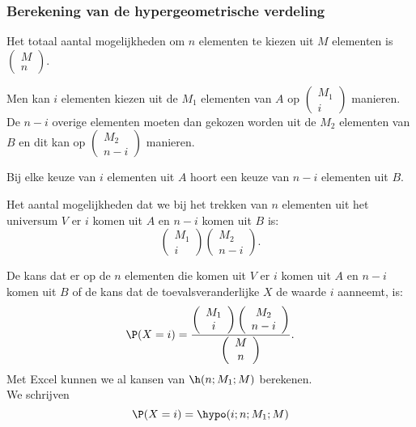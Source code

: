 {\subsubsection{Berekening van de hypergeometrische verdeling}
Het totaal aantal mogelijkheden om $n$ elementen te kiezen uit $M$ elementen is
$\left(\begin{array}{c}
M\\
n
\end{array}
\right)$. 

Men kan $i$ elementen kiezen uit de $M_1$ elementen van $A$ op 
$\left(\begin{array}{c}
M_1\\
i
\end{array}
\right)$ 
manieren. 
De $n-i$ overige elementen moeten dan gekozen worden uit de $M_2$ elementen van
$B$ en dit kan op 
$\left(\begin{array}{c}
M_2\\
n-i
\end{array}
\right)$ 
manieren. 

Bij elke keuze van $i$ elementen uit $A$ hoort een keuze van $n-i$ elementen uit $B$.


Het aantal mogelijkheden dat we bij het trekken van $n$ elementen uit het universum $V$ er $i$ komen uit $A$ en $n-i$ komen uit $B$ is: 
$$\left(\begin{array}{c}
M_1\\
i
\end{array}
\right) 
\left(\begin{array}{c}
M_2\\
n-i
\end{array}
\right).$$

De kans dat er op de $n$ elementen die komen uit $V$ 
er $i$  komen uit  $A$ en $n-i$ komen uit $B$ of de kans dat de toevalsveranderlijke $X$ de waarde $i$ aanneemt, is:
$$\P(X=i)=\frac{\left(\begin{array}{c}
M_1\\
i
\end{array}
\right)
\left(\begin{array}{c}
M_2\\
n-i
\end{array}
\right)}
{\left(\begin{array}{c}
M\\
n
\end{array}
\right)}.$$
Met Excel kunnen we al kansen van $\h(n;M_1;M)$ berekenen. \\We schrijven 
$$\P(X=i)=\hypo(i;n;M_1;M)$$

}
